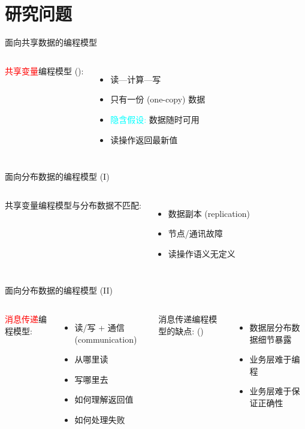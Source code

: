 \section{研究问题}

\begin{frame}{面向共享数据的编程模型}
  \begin{columns}
      \textcolor{red}{共享变量}编程模型 (): 
      \begin{itemize}
	\item 读---计算---写
	\item 只有一份 (one-copy) 数据
	\item \textcolor{cyan}{\footnotesize 隐含假设:} 数据随时可用
	\item 读操作返回最新值 
      \end{itemize}
  \end{columns}
\end{frame}
\begin{frame}{面向分布数据的编程模型 (I)}
  \begin{columns}
      共享变量编程模型与分布数据不匹配:
      \begin{itemize}
	\item 数据副本 (replication)
	\item 节点/通讯故障
	\item 读操作语义无定义
      \end{itemize}
  \end{columns}
\end{frame}
\begin{frame}{面向分布数据的编程模型 (II)}
  \begin{columns}[t]
      \textcolor{red}{消息传递}编程模型:
      \begin{itemize}
	\item 读/写 + 通信 (communication)
	\item 从哪里读
	\item 写哪里去
	\item 如何理解返回值
	\item 如何处理失败
      \end{itemize}
      消息传递编程模型的缺点: ()
      \begin{itemize}
	\item 数据层分布数据细节暴露
	\item 业务层难于编程
	\item 业务层难于保证正确性
      \end{itemize}
  \end{columns}
\end{frame}
